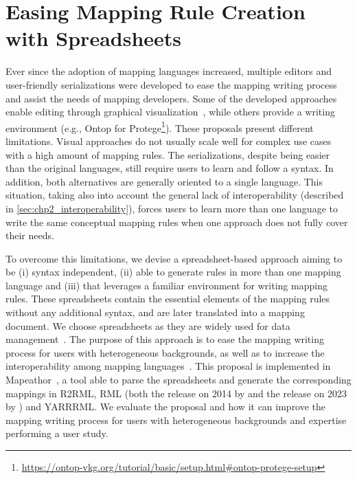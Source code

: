 \section{Easing Mapping Rule Creation with Spreadsheets}
\label{sec:chp5_mapeathor}

Ever since the adoption of mapping languages increased, multiple editors and user-friendly serializations were developed to ease the mapping writing process and assist the needs of mapping developers. Some of the developed approaches enable editing through graphical visualization~\parencite{heyvaert2016rmleditor,sicilia2017map}, while others provide a writing environment (e.g., Ontop for Protege\footnote{\url{https://ontop-vkg.org/tutorial/basic/setup.html\#ontop-protege-setup}}). 
These proposals present different limitations. 
Visual approaches do not usually scale well for complex use cases with a high amount of mapping rules.
The serializations, despite being easier than the original languages, still require users to learn and follow a syntax. 
In addition, both alternatives are generally oriented to a single language. 
This situation, taking also into account the general lack of interoperability (described in \cref{sec:chp2_interoperability}), forces users to learn more than one language to write the same conceptual mapping rules when one approach does not fully cover their needs.

To overcome this limitations, we devise a spreadsheet-based approach aiming to be (i) syntax independent, (ii) able to generate rules in more than one mapping language and (iii) that leverages a familiar environment for writing  mapping rules.
These spreadsheets contain the essential elements of the mapping rules without any additional syntax, and are later translated into a mapping document.
We choose spreadsheets as they are widely used for data management~\parencite{birch2018spreadsheets,bradbard2014spreadsheet,pemberton2000spreadsheets}.
The purpose of this approach is to ease the mapping writing process for users with heterogeneous backgrounds, as well as to increase the interoperability among mapping languages~\parencite{corcho2020towards, iglesias2022devising}. 
This proposal is implemented in Mapeathor~\parencite{iglesias-molina_2023_5973906}, a tool able to parse the spreadsheets and generate the corresponding mappings in R2RML, RML (both the release on 2014 by \cite{Dimou2014rml} and the release on 2023 by \cite{iglesias2023rml}) and YARRRML.
We evaluate the proposal and how it can improve the mapping writing process for users with heterogeneous backgrounds and expertise performing a user study.

